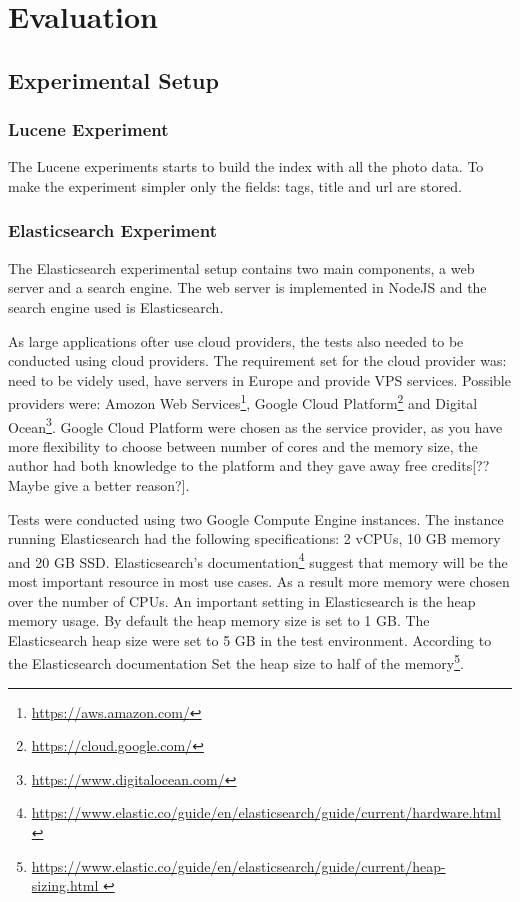 \chapter{Evaluation}
\label{ch:evaluation}

\section{Experimental Setup}

\subsection{Lucene Experiment}
The Lucene experiments starts to build the index with all the photo data.
To make the experiment simpler only the fields: tags, title and url are stored.

\subsection{Elasticsearch Experiment}
The Elasticsearch experimental setup contains two main components, a web server and a search engine.
The web server is implemented in NodeJS and the search engine used is Elasticsearch.

As large applications ofter use cloud providers, the tests also needed to be conducted using cloud providers.
The requirement set for the cloud provider was: need to be videly used, have servers in Europe and provide VPS services.
Possible providers were: Amozon Web Services\footnote{\url{https://aws.amazon.com/}},
Google Cloud Platform\footnote{\url{https://cloud.google.com/}} and Digital Ocean\footnote{\url{https://www.digitalocean.com/}}.
Google Cloud Platform were chosen as the service provider, as you have more flexibility to choose between number of cores and the memory size,
the author had both knowledge to the platform and they gave away free credits[?? Maybe give a better reason?].

Tests were conducted using two Google Compute Engine instances.
The instance running Elasticsearch had the following specifications: 2 vCPUs, 10 GB memory and 20 GB SSD.
Elasticsearch's documentation\footnote{\url{https://www.elastic.co/guide/en/elasticsearch/guide/current/hardware.html}} suggest that memory will be the most important resource in most use cases.
As a result more memory were chosen over the number of CPUs.
An important setting in Elasticsearch is the heap memory usage.
By default the heap memory size is set to 1 GB.
The Elasticsearch heap size were set to 5 GB in the test environment.
According to the Elasticsearch documentation
Set the heap size to half of the memory\footnote{\url{https://www.elastic.co/guide/en/elasticsearch/guide/current/heap-sizing.html  }}.

